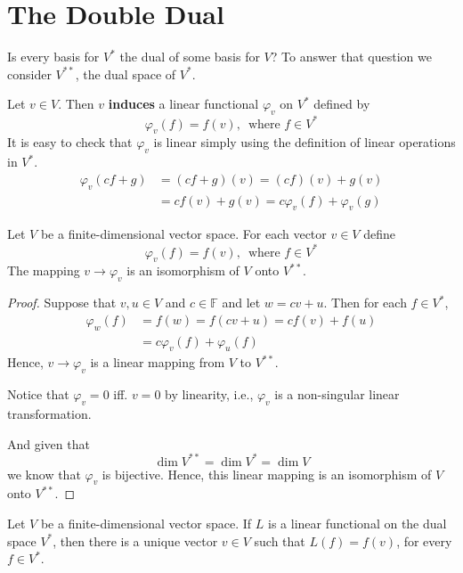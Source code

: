 \section{The Double Dual}

Is every basis for $V^\ast$ the dual of some basis for $V$? To answer that question we consider $V^{\ast \ast}$, the dual space of $V^\ast$.
	
Let $v \in V$. Then $v$ \textbf{induces} a linear functional $\varphi_v$ on $V^\ast$ defined by
\[
	\varphi_v (f) = f(v), \, \text{ where } f \in V^\ast
\]
It is easy to check that $\varphi_v$ is linear simply using the definition of linear operations in $V^\ast$.
\begin{equation*}
	\begin{aligned}
		\varphi_v (cf + g) &= (cf+g)(v) = (cf)(v) + g(v) \\
					&= cf(v) + g(v) = c\varphi_v (f) + \varphi_v (g)
	\end{aligned}
\end{equation*}

\begin{theorem}
	Let $V$ be a finite-dimensional vector space. For each vector $v \in V$ define
	\[
		\varphi_v (f) = f(v), \, \text{ where } f \in V^\ast
	\]
	The mapping $v \longrightarrow \varphi_v$ is an isomorphism of $V$ onto $V^{\ast \ast}$.
\end{theorem}

\begin{proof}
	Suppose that $v, u \in V$ and $c \in \mathbb{F}$ and let $w = cv + u$. Then for each $f \in V^\ast$,
	\begin{equation*}
		\begin{aligned}
			\varphi_w (f) &= f(w) = f(cv + u) = cf(v) + f(u) \\
				   &= c\varphi_v (f) + \varphi_u (f)
		\end{aligned}
	\end{equation*}
	Hence, $v \longrightarrow \varphi_v$ is a linear mapping from $V$ to $V^{\ast \ast}$.

	Notice that $\varphi_v = 0$ iff. $v = 0$ by linearity, i.e., $\varphi_v$ is a non-singular linear transformation.

	And given that 
	\[
		\dim V^{\ast \ast} = \dim V^\ast = \dim V
	\]
	we know that $\varphi_v$ is bijective. Hence, this linear mapping is an isomorphism of $V$ onto $V^{\ast \ast}$.
\end{proof}

\begin{corollary}
	Let $V$ be a finite-dimensional vector space. If $L$ is a linear functional on the dual space $V^\ast$, then there is a unique vector $v \in V$ such that $L(f) = f(v)$, for every $f \in V^\ast$.
\end{corollary}

